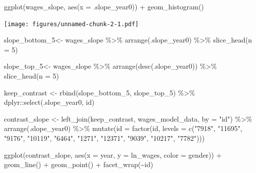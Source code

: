 \documentclass{article}
\newenvironment{Shaded}{\begin{snugshade}}{\end{snugshade}}
\newcommand{\AttributeTok}[1]{\textcolor[rgb]{0.77,0.63,0.00}{#1}}
\newcommand{\DecValTok}[1]{\textcolor[rgb]{0.00,0.00,0.81}{#1}}
\newcommand{\FunctionTok}[1]{\textcolor[rgb]{0.00,0.00,0.00}{#1}}
\newcommand{\NormalTok}[1]{#1}
\newcommand{\OtherTok}[1]{\textcolor[rgb]{0.56,0.35,0.01}{#1}}
\newcommand{\SpecialCharTok}[1]{\textcolor[rgb]{0.00,0.00,0.00}{#1}}
\newcommand{\StringTok}[1]{\textcolor[rgb]{0.31,0.60,0.02}{#1}}
\begin{document}
\begin{Shaded}
\begin{Highlighting}[]
\FunctionTok{ggplot}\NormalTok{(wages\_slope, }\FunctionTok{aes}\NormalTok{(}\AttributeTok{x =}\NormalTok{ .slope\_year0)) }\SpecialCharTok{+}
  \FunctionTok{geom\_histogram}\NormalTok{()}
\end{Highlighting}
\end{Shaded}

\texttt{[image: figures/unnamed-chunk-2-1.pdf]}

\begin{Shaded}
\begin{Highlighting}[]
\NormalTok{slope\_bottom\_5}\OtherTok{\textless{}{-}}\NormalTok{ wages\_slope }\SpecialCharTok{\%\textgreater{}\%}
  \FunctionTok{arrange}\NormalTok{(.slope\_year0) }\SpecialCharTok{\%\textgreater{}\%}
  \FunctionTok{slice\_head}\NormalTok{(}\AttributeTok{n =} \DecValTok{5}\NormalTok{)}

\NormalTok{slope\_top\_5}\OtherTok{\textless{}{-}}\NormalTok{ wages\_slope }\SpecialCharTok{\%\textgreater{}\%}
  \FunctionTok{arrange}\NormalTok{(}\FunctionTok{desc}\NormalTok{(.slope\_year0)) }\SpecialCharTok{\%\textgreater{}\%}
  \FunctionTok{slice\_head}\NormalTok{(}\AttributeTok{n =} \DecValTok{5}\NormalTok{)}

\NormalTok{keep\_contrast }\OtherTok{\textless{}{-}} \FunctionTok{rbind}\NormalTok{(slope\_bottom\_5, slope\_top\_5) }\SpecialCharTok{\%\textgreater{}\%}
\NormalTok{  dplyr}\SpecialCharTok{::}\FunctionTok{select}\NormalTok{(.slope\_year0, id)}

\NormalTok{contrast\_slope }\OtherTok{\textless{}{-}} \FunctionTok{left\_join}\NormalTok{(keep\_contrast, wages\_model\_data, }\AttributeTok{by =} \StringTok{"id"}\NormalTok{) }\SpecialCharTok{\%\textgreater{}\%}
  \FunctionTok{arrange}\NormalTok{(.slope\_year0) }\SpecialCharTok{\%\textgreater{}\%}
  \FunctionTok{mutate}\NormalTok{(}\AttributeTok{id =} \FunctionTok{factor}\NormalTok{(id, }\AttributeTok{levels =} \FunctionTok{c}\NormalTok{(}\StringTok{"7918"}\NormalTok{, }\StringTok{"11695"}\NormalTok{, }\StringTok{"9176"}\NormalTok{, }\StringTok{"10119"}\NormalTok{, }\StringTok{"6464"}\NormalTok{, }\StringTok{"1271"}\NormalTok{, }
                                    \StringTok{"12371"}\NormalTok{, }\StringTok{"9039"}\NormalTok{, }\StringTok{"10217"}\NormalTok{, }\StringTok{"7782"}\NormalTok{)))}
  

\FunctionTok{ggplot}\NormalTok{(contrast\_slope, }\FunctionTok{aes}\NormalTok{(}\AttributeTok{x =}\NormalTok{ year, }\AttributeTok{y =}\NormalTok{ ln\_wages, }\AttributeTok{color =}\NormalTok{ gender)) }\SpecialCharTok{+}
  \FunctionTok{geom\_line}\NormalTok{() }\SpecialCharTok{+}
  \FunctionTok{geom\_point}\NormalTok{() }\SpecialCharTok{+}
  \FunctionTok{facet\_wrap}\NormalTok{(}\SpecialCharTok{\textasciitilde{}}\NormalTok{id)}
\end{Highlighting}
\end{Shaded}
\end{document}
